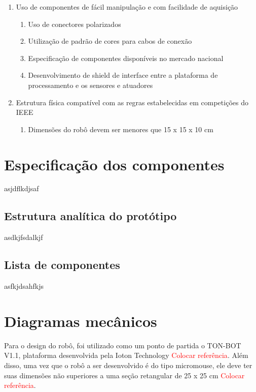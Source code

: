 \begin{enumerate}
	\item Uso de componentes de fácil manipulação e com facilidade de aquisição
		\begin{enumerate}
			\item Uso de conectores polarizados
			\item Utilização de padrão de cores para cabos de conexão
			\item Especificação de componentes disponíveis no mercado nacional
			\item Desenvolvimento de shield de interface entre a plataforma de processamento e os sensores e atuadores
		\end{enumerate}
		
	\item Estrutura física compatível com as regras estabelecidas em competições do IEEE
		\begin{enumerate}
			\item Dimensões do robô devem ser menores que 15 x 15 x 10 cm
		\end{enumerate}
\end{enumerate}

\section{Especificação dos componentes}
\label{sec:espc}
asjdflkdjsaf

\subsection{Estrutura analítica do protótipo}
\label{ssec:pbs}
asdkjfsdalkjf

\subsection{Lista de componentes}
\label{ssec:list}
asfkjdsahfkjs


\section{Diagramas mecânicos}
\label{sec:diagm}
Para o design do robô, foi utilizado como um ponto de partida o TON-BOT V1.1, plataforma desenvolvida pela Ioton Technology \textcolor{red}{Colocar referência}. Além disso, uma vez que o robô a ser desenvolvido é do tipo micromouse, ele deve ter suas dimensões não superiores a uma seção retangular de 25 x 25 cm \textcolor{red}{Colocar referência}.


